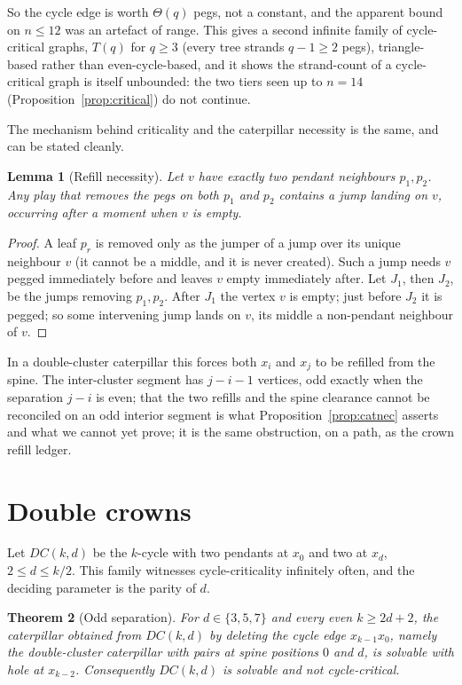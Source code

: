 \documentclass[11pt]{article}
\newtheorem{theorem}{Theorem}[section]
\newtheorem{lemma}[theorem]{Lemma}
\theoremstyle{definition}
\begin{document}
So the cycle edge is worth $\Theta(q)$ pegs, not a constant, and the
apparent bound on $n\le 12$ was an artefact of range. This gives a
second infinite family of cycle-critical graphs, $T(q)$ for $q\ge 3$
(every tree strands $q-1\ge 2$ pegs), triangle-based rather than
even-cycle-based, and it shows the strand-count of a cycle-critical
graph is itself unbounded: the two tiers seen up to $n=14$
(Proposition~\ref{prop:critical}) do not continue.

The mechanism behind criticality and the caterpillar necessity is the
same, and can be stated cleanly.

\begin{lemma}[Refill necessity]\label{lem:refill}
Let $v$ have exactly two pendant neighbours $p_1,p_2$. Any play that
removes the pegs on both $p_1$ and $p_2$ contains a jump landing on
$v$, occurring after a moment when $v$ is empty.
\end{lemma}

\begin{proof}
A leaf $p_r$ is removed only as the jumper of a jump over its unique
neighbour $v$ (it cannot be a middle, and it is never created). Such
a jump needs $v$ pegged immediately before and leaves $v$ empty
immediately after. Let $J_1$, then $J_2$, be the jumps removing
$p_1,p_2$. After $J_1$ the vertex $v$ is empty; just before $J_2$ it
is pegged; so some intervening jump lands on $v$, its middle a
non-pendant neighbour of $v$.
\end{proof}

In a double-cluster caterpillar this forces both $x_i$ and $x_j$ to
be refilled from the spine. The inter-cluster segment has
$j-i-1$ vertices, odd exactly when the separation $j-i$ is even; that
the two refills and the spine clearance cannot be reconciled on an
odd interior segment is what Proposition~\ref{prop:catnec} asserts and
what we cannot yet prove; it is the same obstruction, on a path, as
the crown refill ledger.

\section{Double crowns}\label{sec:dc}

Let $DC(k,d)$ be the $k$-cycle with two pendants at $x_0$ and two at
$x_d$, $2\le d\le k/2$. This family witnesses cycle-criticality
infinitely often, and the deciding parameter is the parity of $d$.

\begin{theorem}[Odd separation]\label{thm:oddside}
For $d\in\{3,5,7\}$ and every even $k\ge 2d+2$, the caterpillar
obtained from $DC(k,d)$ by deleting the cycle edge $x_{k-1}x_0$,
namely the double-cluster caterpillar with pairs at spine positions
$0$ and $d$, is solvable with hole at $x_{k-2}$. Consequently
$DC(k,d)$ is solvable and not cycle-critical.
\end{theorem}
\end{document}
